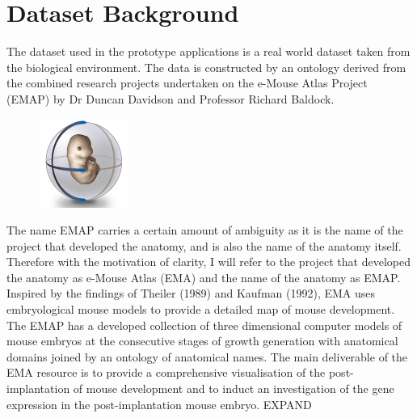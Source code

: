 \chapter{Dataset Background}
The dataset used in the prototype applications is a real world dataset taken from the biological environment. The data is constructed by an ontology derived from the combined research projects undertaken on the e-Mouse Atlas Project (EMAP) by Dr Duncan Davidson and Professor Richard Baldock.\begin{figure}\includegraphics[width=0.9\linewidth]{images/ema_logo}\end{figure} The name EMAP carries a certain amount of ambiguity as it is the name of the project that developed the anatomy, and is also the name of the anatomy itself. Therefore with the motivation of clarity, I will refer to the project that developed the anatomy as e-Mouse Atlas (EMA) and the name of the anatomy as EMAP. Inspired by the findings of Theiler (1989) and Kaufman (1992), EMA uses embryological mouse models to provide a detailed map of mouse development. The EMAP has a developed collection of three dimensional computer models of mouse embryos at the consecutive stages of growth generation with anatomical domains joined by an ontology of anatomical names. The main deliverable of the EMA resource is to provide a comprehensive visualisation of the post-implantation of mouse development and to induct an investigation of the gene expression in the post-implantation mouse embryo.
EXPAND

